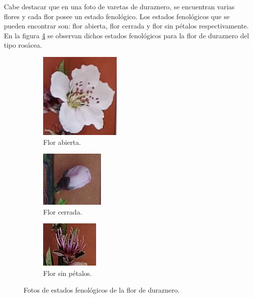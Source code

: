 \newpage

Cabe destacar que en una foto de varetas de duraznero, se encuentran varias flores y cada flor posee un estado fenológico. Los estados fenológicos que se pueden encontrar son: flor abierta, flor cerrada y flor sin pétalos respectivamente. En la figura \ref{fig:estadoFeno} se observan dichos estados fenológicos para la flor de duraznero del tipo rosácea.

\begin{figure}[!htp]
     \centering
     \begin{subfigure}[b]{0.4\textwidth}
         \centering
         \includegraphics[scale=0.4]{./Figures/flor_abierta.png}
         \caption{Flor abierta.}
         \label{fig:1de33}
     \end{subfigure}
     \hfill
     \begin{subfigure}[b]{0.2\textwidth}
         \centering
         \includegraphics[scale=0.5]{./Figures/flor_cer.png}
         \caption{Flor cerrada.}
         \label{fig:2de33}
     \end{subfigure}
     \hfill
     \begin{subfigure}[b]{0.3\textwidth}
         \centering
         \includegraphics[scale=0.6]{./Figures/flor_sinp.png}
         \caption{Flor sin pétalos.}
         \label{fig:3de33}
     \end{subfigure}
        \caption{Fotos de estados fenológicos de la flor de duraznero.}
        \label{fig:estadoFeno}
\end{figure}

